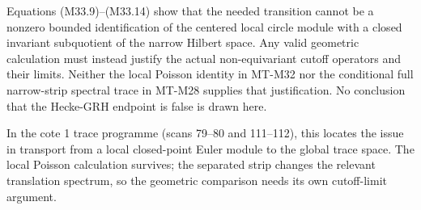 Equations (M33.9)--(M33.14) show that the needed transition
cannot be a nonzero bounded identification of the
centered local circle module with a closed invariant
subquotient of the narrow Hilbert space.  Any valid
geometric calculation must instead justify the actual
non-equivariant cutoff operators and their limits.
Neither the local Poisson identity in MT-M32 nor the
conditional full narrow-strip spectral trace in MT-M28
supplies that justification.  No conclusion that the
Hecke-GRH endpoint is false is drawn here.

In the cote 1 trace programme (scans 79--80 and 111--112),
this locates the issue in transport from a local
closed-point Euler module to the global trace space.
The local Poisson calculation survives; the separated
strip changes the relevant translation spectrum, so
the geometric comparison needs its own cutoff-limit
argument.
